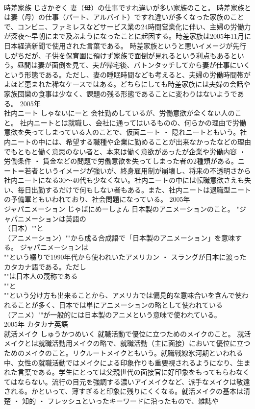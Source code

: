 \documentclass[8pt]{extreport}
\begin{document}
\begin{CJK}{UTF8}{min}
\\	時差家族	じさかぞく	妻（母）の仕事ですれ違いが多い家族のこと。	時差家族とは妻（母）の仕事（パート、アルバイト）ですれ違いが多くなった家族のことで、コンビニ、ファミレスなどサービス業の24時間営業化に伴い、主婦の労働力が深夜～早朝にまで及ぶようになったことに起因する。時差家族は2005年11月に日本経済新聞で使用された言葉である。 時差家族というと悪いイメージが先行しがちだが、子供を保育園に預けず家族で面倒が見れるという利点もあるという。昼間は妻が面倒を見て、夫が帰宅後、バトンタッチしてから妻が仕事にいくという形態である。ただし、妻の睡眠時間なども考えると、夫婦の労働時間帯がよほど恵まれた稀なケースではある。どちらにしても時差家族には夫婦の会話や家族団欒の食事は少なく、課題の残る形態であることに変わりはないようである。	2005年	
\\	社内ニート	しゃないにーと	会社勤めしているが、労働意欲が全くない人のこと。	社内ニートとは就職し、会社に通ってはいるものの、何らかの理由で労働意欲を失ってしまっている人のことで、仮面ニート ・ 隠れニートともいう。社内ニートの中には、希望する職種や企業に勤めることが出来なかったなどの理由でもともと働く意思のない者と、本来は働く意欲があったが企業や労働内容 ・ 労働条件 ・ 賃金などの問題で労働意欲を失ってしまった者の2種類がある。ニート＝若者というイメージが強いが、終身雇用制が崩壊し、将来の不透明さから社内ニートになる30～40代も少なくない。社内ニートの中には転職意欲さえも失い、毎日出勤するだけで何もしない者もある。また、社内ニートは退職型ニートの予備軍ともいわれており、社会問題になっている。	2005年	
\\	ジャパニメーション	じゃぱにめーしょん	日本製のアニメーションのこと。	"ジャパニメーションは英語の
\\	（日本）""と
\\	（アニメーション）""から成る合成語で「日本製のアニメーション」を意味する。 ジャパニメーションは
\\	""という綴りで1990年代から使われいたアメリカン ・ スラングが日本に渡ったカタカナ語である。ただし
\\	""は日本人の蔑称である
\\	""と
\\	""という分け方も出来ることから、アメリカでは偏見的な意味合いを含んで使われることが多く、日本では単にアニメーションの略として使われている
\\	（アニメ）""が一般的には日本製のアニメという意味で使われている。
\\	2005年	カタカナ英語	
\\	就活メイク	しゅうかつめいく	就職活動で優位に立つためのメイクのこと。	就活メイクとは就職活動用メイクの略で、就職活動（主に面接）において優位に立つためのメイクのこと。リクルートメイクともいう。就職戦線氷河期といわれる中、女性の就職活動ではメイクによる印象作りも重要視されるようになり、生まれた言葉である。学生にとっては父親世代の面接官に好印象をもってもらわなくてはならない。流行の目元を強調する濃いアイメイクなど、派手なメイクは敬遠される。かといって、薄すぎると印象に残りにくくなる。就活メイクの基本は清楚 ・ 知的 ・ フレッシュといったキーワードに沿ったもので、雑誌や

\end{CJK}
\end{document}
